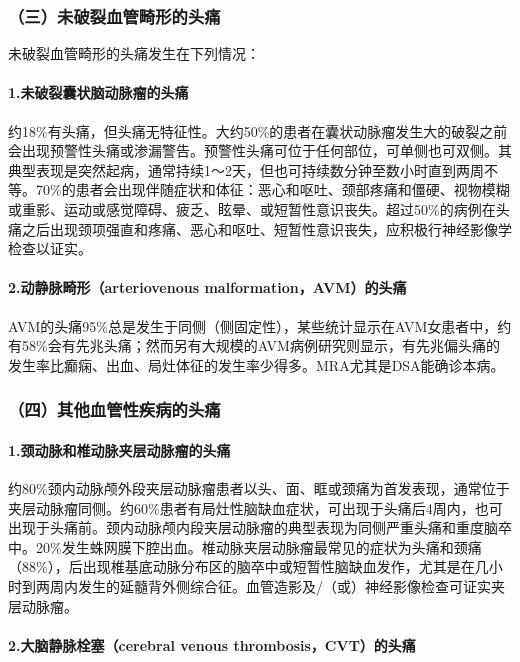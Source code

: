 \subsubsection{（三）未破裂血管畸形的头痛}

未破裂血管畸形的头痛发生在下列情况：

\paragraph{1.未破裂囊状脑动脉瘤的头痛}

约18\%有头痛，但头痛无特征性。大约50\%的患者在囊状动脉瘤发生大的破裂之前会出现预警性头痛或渗漏警告。预警性头痛可位于任何部位，可单侧也可双侧。其典型表现是突然起病，通常持续1～2天，但也可持续数分钟至数小时直到两周不等。70\%的患者会出现伴随症状和体征：恶心和呕吐、颈部疼痛和僵硬、视物模糊或重影、运动或感觉障碍、疲乏、眩晕、或短暂性意识丧失。超过50\%的病例在头痛之后出现颈项强直和疼痛、恶心和呕吐、短暂性意识丧失，应积极行神经影像学检查以证实。

\paragraph{2.动静脉畸形（arteriovenous malformation，AVM）的头痛}

AVM的头痛95\%总是发生于同侧（侧固定性），某些统计显示在AVM女患者中，约有58\%会有先兆头痛；然而另有大规模的AVM病例研究则显示，有先兆偏头痛的发生率比癫痫、出血、局灶体征的发生率少得多。MRA尤其是DSA能确诊本病。

\subsubsection{（四）其他血管性疾病的头痛}

\paragraph{1.颈动脉和椎动脉夹层动脉瘤的头痛}

约80\%颈内动脉颅外段夹层动脉瘤患者以头、面、眶或颈痛为首发表现，通常位于夹层动脉瘤同侧。约60\%患者有局灶性脑缺血症状，可出现于头痛后4周内，也可出现于头痛前。颈内动脉颅内段夹层动脉瘤的典型表现为同侧严重头痛和重度脑卒中。20\%发生蛛网膜下腔出血。椎动脉夹层动脉瘤最常见的症状为头痛和颈痛（88\%），后出现椎基底动脉分布区的脑卒中或短暂性脑缺血发作，尤其是在几小时到两周内发生的延髓背外侧综合征。血管造影及/（或）神经影像检查可证实夹层动脉瘤。

\paragraph{2.大脑静脉栓塞（cerebral venous thrombosis，CVT）的头痛}

